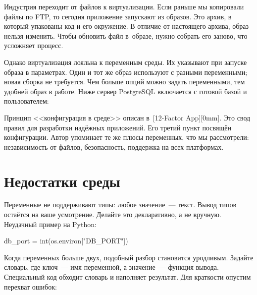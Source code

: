 
Индустрия переходит от файлов к виртуализации. Если раньше мы копировали файлы
по FTP, то сегодня приложение запускают из образов. Это архив, в который
упакованы код и его окружение. В отличие от настоящего архива, образ нельзя
изменить. Чтобы обновить файл в~образе, нужно собрать его заново, что усложняет
процесс.


Однако виртуализация лояльна к переменным среды. Их указывают при запуске образа
в параметрах. Один и тот же образ используют с разными переменными; новая сборка
не требуется. Чем больше опций можно задать переменными, тем удобней образ в
работе. Ниже сервер PostgreSQL включается с готовой базой и пользователем:

\begin{english}
\end{english}


Принцип <<конфигурация в среде>> описан в~[12-Factor App][0mm].
Это свод правил для разработки надёжных приложений. Его третий пункт посвящён конфигурации.
Автор упоминает те же плюсы переменных, что мы рассмотрели: независимость от файлов,
безопасность, поддержка на всех платформах.

\section{Недостатки среды}

\index{декларативность}

Переменные не поддерживают типы: любое значение~--- текст. Вывод типов остаётся
на ваше усмотрение. Делайте это декларативно, а не вручную. Неудачный пример на
Python:

\index{языки!Python}

\begin{english}
  \begin{python}
db_port = int(os.environ["DB_PORT"])
  \end{python}
\end{english}

Когда переменных больше двух, подобный разбор становится уродливым. Задайте
словарь, где ключ~--- имя переменной, а значение~--- функция вывода. Специальный
код обходит словарь и наполняет результат. Для краткости опустим перехват
ошибок:

